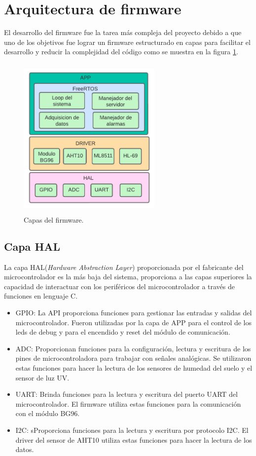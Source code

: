 \section{Arquitectura de firmware}
El desarrollo del firmware fue la tarea más compleja del proyecto debido a que uno de los objetivos fue lograr un firmware estructurado en capas para facilitar el desarrollo y reducir la complejidad del código como se muestra en la figura \ref{fig:Capas del firmware}.

\begin{figure}[h]
  \centering
	\includegraphics[width=7cm, height=8cm]{./Figures/Capas del firmware.png}
	\caption{Capas del firmware.}
	\label{fig:Capas del firmware}
\end{figure}

\subsection{Capa HAL} 
La capa HAL(\textit{Hardware Abstraction Layer}) proporcionada por el fabricante del microcontrolador  es la más baja del sistema, proporciona a las capas superiores la capacidad de interactuar con los periféricos del  microcontrolador a través de funciones en lenguaje C.
\begin{itemize}
  \item GPIO: La API proporciona funciones  para gestionar las entradas y salidas del microcontrolador. Fueron utilizadas por la capa de APP para el control de los leds de debug y para el encendido y reset del módulo de comunicación.
  \item ADC: Proporcionan funciones para la configuración, lectura y escritura de los pines de microcontroladora para trabajar con señales analógicas. Se utilizaron estas funciones para hacer la lectura de los sensores de humedad del suelo y el sensor de luz UV.
  \item UART: Brinda funciones para la lectura y escritura del puerto UART del microcontrolador. El firmware utiliza estas funciones para la comunicación con el módulo BG96.
  \item I2C: sProporciona funciones para la lectura y escritura por protocolo I2C. El driver del sensor de AHT10 utiliza estas funciones para hacer la lectura de los datos.
    
\end{itemize}

